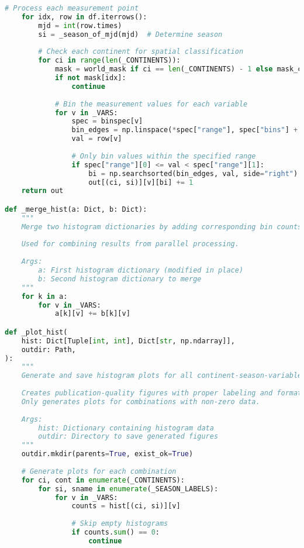 \begin{lstlisting}[language=Python, caption=Histogram Generation Algorithm, label=alg:step03_histos]
    # Process each measurement point
    for idx, row in df.iterrows():
        mjd = int(row.times)
        si = _season_of_mjd(mjd)  # Determine season
        
        # Check each continent for spatial classification
        for ci in range(len(_CONTINENTS)):
            mask = world_mask if ci == len(_CONTINENTS) - 1 else mask_cache[ci]
            if not mask[idx]:
                continue
                
            # Bin the measurement values for each variable
            for v in _VARS:
                spec = binspec[v]
                bin_edges = np.linspace(*spec["range"], spec["bins"] + 1)
                val = row[v]
                
                # Only bin values within the specified range
                if spec["range"][0] <= val < spec["range"][1]:
                    bi = np.searchsorted(bin_edges, val, side="right") - 1
                    out[(ci, si)][v][bi] += 1
    return out

def _merge_hist(a: Dict, b: Dict):
    """
    Merge two histogram dictionaries by adding corresponding bin counts.
    
    Used for combining results from parallel processing.
    
    Args:
        a: First histogram dictionary (modified in place)
        b: Second histogram dictionary to merge
    """
    for k in a:
        for v in _VARS:
            a[k][v] += b[k][v]

def _plot_hist(
    hist: Dict[Tuple[int, int], Dict[str, np.ndarray]],
    outdir: Path,
):
    """
    Generate and save histogram plots for all continent-season-variable combinations.
    
    Creates publication-quality figures with proper labeling and formatting.
    Only generates plots for combinations with non-zero data.
    
    Args:
        hist: Dictionary containing histogram data
        outdir: Directory to save generated figures
    """
    outdir.mkdir(parents=True, exist_ok=True)
    
    # Generate plots for each combination
    for ci, cont in enumerate(_CONTINENTS):
        for si, sname in enumerate(_SEASON_LABELS):
            for v in _VARS:
                counts = hist[(ci, si)][v]
                
                # Skip empty histograms
                if counts.sum() == 0:
                    continue
                    

\end{lstlisting}
